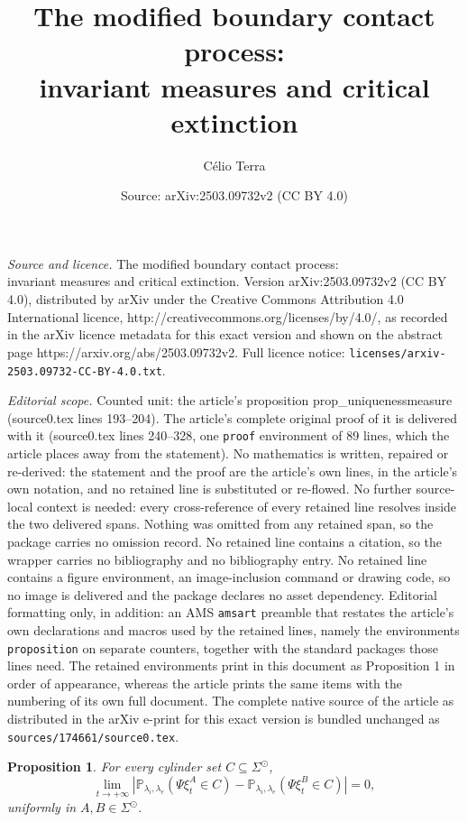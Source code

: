 \documentclass[10pt,a4paper]{amsart}
\title{The modified boundary contact process:\\ invariant measures and critical extinction}
\author{C\'elio Terra}
\date{Source: arXiv:2503.09732v2 (CC BY 4.0)}
\newtheorem{proposition}{Proposition}
\begin{document}
\maketitle

\noindent\emph{Source and licence.} The modified boundary contact process:\\ invariant measures and critical extinction. Version arXiv:2503.09732v2 (CC BY 4.0), distributed by arXiv under the Creative Commons Attribution 4.0 International licence, http://creativecommons.org/licenses/by/4.0/, as recorded in the arXiv licence metadata for this exact version and shown on the abstract page https://arxiv.org/abs/2503.09732v2. Full licence notice: \texttt{licenses/arxiv-2503.09732-CC-BY-4.0.txt}.\par\smallskip

\noindent\textit{Editorial scope.} Counted unit: the article's proposition prop\_uniquenessmeasure (source0.tex lines 193--204). The article's complete original proof of it is delivered with it (source0.tex lines 240--328, one \texttt{proof} environment of 89 lines, which the article places away from the statement). No mathematics is written, repaired or re-derived: the statement and the proof are the article's own lines, in the article's own notation, and no retained line is substituted or re-flowed.  No further source-local context is needed: every cross-reference of every retained line resolves inside the two delivered spans.  Nothing was omitted from any retained span, so the package carries no omission record.  No retained line contains a citation, so the wrapper carries no bibliography and no bibliography entry.  No retained line contains a figure environment, an image-inclusion command or drawing code, so no image is delivered and the package declares no asset dependency.  Editorial formatting only, in addition: an AMS \texttt{amsart} preamble that restates the article's own declarations and macros used by the retained lines, namely the environments \texttt{proposition} on separate counters, together with the standard packages those lines need.  The retained environments print in this document as Proposition 1 in order of appearance, whereas the article prints the same items with the numbering of its own full document.  The complete native source of the article as distributed in the arXiv e-print for this exact version is bundled unchanged as \texttt{sources/174661/source0.tex}.
	\begin{proposition} \label{prop_uniquenessmeasure}
		For every cylinder set $C\subseteq\Sigma^{\odot}$,
		\begin{equation*}
			\lim_{t\to+\infty}
			\left|
			\mathbb{P}_{\lambda_i,\lambda_e}(\Psi\xi_t^A\in C)
			-
			\mathbb{P}_{\lambda_i,\lambda_e}(\Psi\xi_t^B\in C)
			\right|=0,
		\end{equation*}
		uniformly in $A,B\in\Sigma^{\odot}$.
	\end{proposition}
\end{document}
